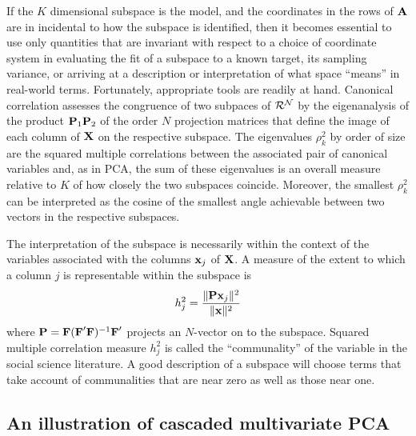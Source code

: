 \documentclass[12pt]{article}
\begin{document}
If the $K$ dimensional subspace is the model, and the coordinates in the rows of $\mbox{\bf A}$ are in incidental to how the subspace is identified, then it becomes essential to use only quantities that are invariant with respect to a choice of coordinate system in evaluating the fit of a subspace to a known target, its sampling variance, or arriving at a description or interpretation of what space ``means'' in real-world terms.  Fortunately, appropriate tools are readily at hand.  Canonical correlation assesses the congruence of two subpaces of $\cal{R}^{N}$ by the eigenanalysis of the product $\mbox{\bf P}_1 \mbox{\bf P}_2$ of the order $N$ projection matrices that define the image of each column of $\mbox{\bf X}$ on the respective subspace.  The eigenvalues $\rho_k^2$ by order of size are the squared multiple correlations between the associated pair of canonical variables and, as in PCA, the sum of these eigenvalues is an overall measure relative to $K$ of how closely the two subspaces coincide.  Moreover, the smallest $\rho^2_k$ can be interpreted as the cosine of the smallest angle achievable between two vectors in the respective subspaces.

The interpretation of the subspace is necessarily within the context of the variables associated with the columns $\mbox{\bf x}_j$ of $\mbox{\bf X}$.  A measure of the extent to which a column $j$ is representable within the subspace is
\begin{equation} \label{hdef}
  h_j^2 = \frac{\| \mbox{\bf P} \mbox{\bf x}_j \|^2 }{ \| \mbox{\bf x}\|^2 }
\end{equation}
where $\mbox{\bf P} = \mbox{\bf F} (\mbox{\bf F}'\mbox{\bf F})^{-1} \mbox{\bf F}'$ projects an $N$-vector on to the subspace.  Squared multiple correlation measure $h_j^2$ is called the ``communality'' of the variable in the social science literature.  A good description of a subspace will choose terms that take account of communalities that are near zero as well as those near one.


\subsection{An illustration of cascaded multivariate PCA}
\label{subsec:PCMPCAexample}
\end{document}
